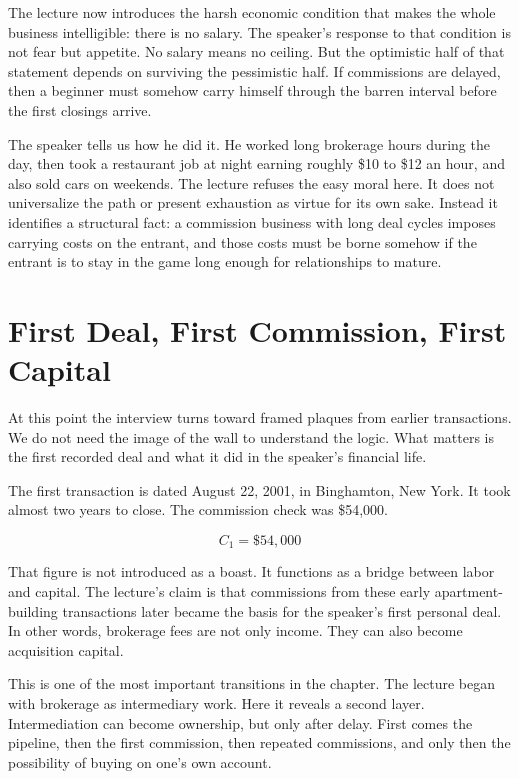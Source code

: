 The lecture now introduces the harsh economic condition that makes the whole business intelligible: there is no salary. The speaker's response to that condition is not fear but appetite. No salary means no ceiling. But the optimistic half of that statement depends on surviving the pessimistic half. If commissions are delayed, then a beginner must somehow carry himself through the barren interval before the first closings arrive.

The speaker tells us how he did it. He worked long brokerage hours during the day, then took a restaurant job at night earning roughly \$10 to \$12 an hour, and also sold cars on weekends. The lecture refuses the easy moral here. It does not universalize the path or present exhaustion as virtue for its own sake. Instead it identifies a structural fact: a commission business with long deal cycles imposes carrying costs on the entrant, and those costs must be borne somehow if the entrant is to stay in the game long enough for relationships to mature.

\section{First Deal, First Commission, First Capital}

At this point the interview turns toward framed plaques from earlier transactions. We do not need the image of the wall to understand the logic. What matters is the first recorded deal and what it did in the speaker's financial life.

The first transaction is dated August 22, 2001, in Binghamton, New York. It took almost two years to close. The commission check was \$54,000.

\begin{equation}
C_1 = \$54{,}000
\end{equation}

That figure is not introduced as a boast. It functions as a bridge between labor and capital. The lecture's claim is that commissions from these early apartment-building transactions later became the basis for the speaker's first personal deal. In other words, brokerage fees are not only income. They can also become acquisition capital.

This is one of the most important transitions in the chapter. The lecture began with brokerage as intermediary work. Here it reveals a second layer. Intermediation can become ownership, but only after delay. First comes the pipeline, then the first commission, then repeated commissions, and only then the possibility of buying on one's own account.

